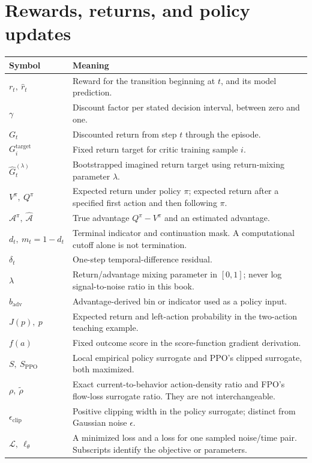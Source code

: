 \section*{Rewards, returns, and policy updates}
\begin{longtable}{@{}p{40mm}p{116mm}@{}}
\toprule Symbol & Meaning\\\midrule\endhead
$r_t,\ \widehat r_t$ & Reward for the transition beginning at $t$, and its model prediction.\\
$\gamma$ & Discount factor per stated decision interval, between zero and one.\\
$G_t$ & Discounted return from step $t$ through the episode.\\
$G_i^{\mathrm{target}}$ & Fixed return target for critic training sample $i$.\\
$\widehat G_t^{(\lambda)}$ & Bootstrapped imagined return target using return-mixing parameter $\lambda$.\\
$V^\pi,\ Q^\pi$ & Expected return under policy $\pi$; expected return after a specified first action and then following $\pi$.\\
$\mathcal A^\pi,\ \widehat{\mathcal A}$ & True advantage $Q^\pi-V^\pi$ and an estimated advantage.\\
$d_t,\ m_t=1-d_t$ & Terminal indicator and continuation mask. A computational cutoff alone is not termination.\\
$\delta_t$ & One-step temporal-difference residual.\\
$\lambda$ & Return/advantage mixing parameter in $[0,1]$; never log signal-to-noise ratio in this book.\\
$b_{\mathrm{adv}}$ & Advantage-derived bin or indicator used as a policy input.\\
$J(p),\ p$ & Expected return and left-action probability in the two-action teaching example.\\
$f(a)$ & Fixed outcome score in the score-function gradient derivation.\\
$S,\ S_{\mathrm{PPO}}$ & Local empirical policy surrogate and PPO's clipped surrogate, both maximized.\\
$\rho,\ \tilde\rho$ & Exact current-to-behavior action-density ratio and FPO's flow-loss surrogate ratio. They are not interchangeable.\\
$\epsilon_{\mathrm{clip}}$ & Positive clipping width in the policy surrogate; distinct from Gaussian noise $\epsilon$.\\
$\mathcal L,\ \ell_\theta$ & A minimized loss and a loss for one sampled noise/time pair. Subscripts identify the objective or parameters.\\

\end{longtable}
